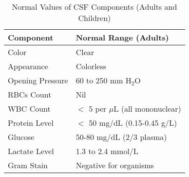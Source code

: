 	\begin{table}[ht]
		\centering
		\caption{Normal Values of CSF Components (Adults and Children)}
		\begin{tabular}{|l|l|}
			\hline
			\textbf{Component} & \textbf{Normal Range (Adults)} \\
			\hline
			Color & Clear \\
			Appearance & Colorless \\
			Opening Pressure & 60 to 250 mm H$_2$O \\
			RBCs Count & Nil \\
			WBC Count & $<$ 5 per $\mu$L (all mononuclear) \\
			Protein Level & $<$ 50 mg/dL (0.15-0.45 g/L) \\
			Glucose & 50-80 mg/dL (2/3 plasma) \\
			Lactate Level & 1.3 to 2.4 mmol/L \\
			Gram Stain & Negative for organisms \\
			\hline
		\end{tabular}
	\end{table}
	
